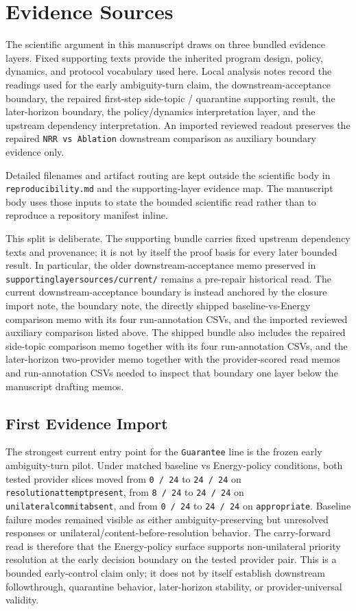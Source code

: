 \documentclass[11pt]{article}
\renewcommand{\_}{\textunderscore\hspace{0pt}}
\begin{document}
\section{Evidence Sources}

The scientific argument in this manuscript draws on three bundled evidence
layers. Fixed supporting texts provide the inherited program design, policy,
dynamics, and protocol vocabulary used here. Local analysis notes record the
readings used for the early ambiguity-turn claim, the
downstream-acceptance boundary, the repaired first-step side-topic /
quarantine supporting result, the later-horizon boundary, the
policy/dynamics interpretation layer, and the upstream dependency
interpretation. An imported reviewed readout preserves the repaired
\texttt{NRR vs Ablation} downstream comparison as auxiliary boundary evidence
only.

Detailed filenames and artifact routing are kept outside the scientific body in
\texttt{reproducibility.md} and the supporting-layer evidence map. The
manuscript body uses those inputs to state the bounded scientific read rather
than to reproduce a repository manifest inline.

This split is deliberate. The supporting bundle carries fixed upstream
dependency texts and provenance; it is not by itself the proof basis for every
later bounded result. In particular, the older downstream-acceptance memo
preserved in \texttt{supporting\_layer\_sources/current/} remains a pre-repair
historical read. The current downstream-acceptance boundary is instead anchored
by the closure import note, the boundary note, the directly shipped
baseline-vs-Energy comparison memo with its four run-annotation CSVs, and the
imported reviewed auxiliary comparison listed above. The shipped bundle also
includes the repaired side-topic comparison memo together with its four
run-annotation CSVs, and the later-horizon two-provider memo together with the
provider-scored read memos and run-annotation CSVs needed to inspect that
boundary one layer below the manuscript drafting memos.

\subsection{First Evidence Import}

The strongest current entry point for the \texttt{Guarantee} line is the frozen
early ambiguity-turn pilot. Under matched baseline vs Energy-policy conditions,
both tested provider slices moved from \texttt{0 / 24} to \texttt{24 / 24} on
\texttt{resolution\_attempt\_present}, from \texttt{8 / 24} to
\texttt{24 / 24} on \texttt{unilateral\_commit\_absent}, and from
\texttt{0 / 24} to \texttt{24 / 24} on \texttt{appropriate}. Baseline failure
modes remained visible as either ambiguity-preserving but unresolved responses
or unilateral/content-before-resolution behavior. The carry-forward read is
therefore that the Energy-policy surface supports
non-unilateral priority resolution at the early decision boundary on the tested
provider pair. This is a bounded early-control claim only; it does not by
itself establish downstream followthrough, quarantine behavior,
later-horizon stability, or provider-universal validity.
\end{document}
